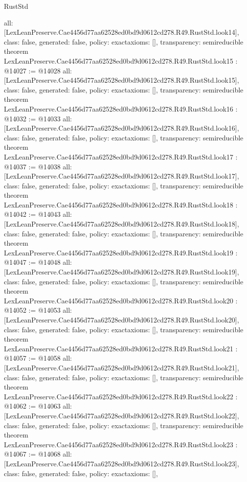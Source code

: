\begin{lexlean}{RustStd}
\begin{coremodule}
{  all: [LexLeanPreserve.Cae4456d77aa62528ed0bd9d0612cd278.R49.RustStd.look14],
  class: false,
  generated: false,
  policy: exact{axioms: []},
  transparency: semireducible
}
theorem LexLeanPreserve.Cae4456d77aa62528ed0bd9d0612cd278.R49.RustStd.look15 : @14027 := @14028 {
  all: [LexLeanPreserve.Cae4456d77aa62528ed0bd9d0612cd278.R49.RustStd.look15],
  class: false,
  generated: false,
  policy: exact{axioms: []},
  transparency: semireducible
}
theorem LexLeanPreserve.Cae4456d77aa62528ed0bd9d0612cd278.R49.RustStd.look16 : @14032 := @14033 {
  all: [LexLeanPreserve.Cae4456d77aa62528ed0bd9d0612cd278.R49.RustStd.look16],
  class: false,
  generated: false,
  policy: exact{axioms: []},
  transparency: semireducible
}
theorem LexLeanPreserve.Cae4456d77aa62528ed0bd9d0612cd278.R49.RustStd.look17 : @14037 := @14038 {
  all: [LexLeanPreserve.Cae4456d77aa62528ed0bd9d0612cd278.R49.RustStd.look17],
  class: false,
  generated: false,
  policy: exact{axioms: []},
  transparency: semireducible
}
theorem LexLeanPreserve.Cae4456d77aa62528ed0bd9d0612cd278.R49.RustStd.look18 : @14042 := @14043 {
  all: [LexLeanPreserve.Cae4456d77aa62528ed0bd9d0612cd278.R49.RustStd.look18],
  class: false,
  generated: false,
  policy: exact{axioms: []},
  transparency: semireducible
}
theorem LexLeanPreserve.Cae4456d77aa62528ed0bd9d0612cd278.R49.RustStd.look19 : @14047 := @14048 {
  all: [LexLeanPreserve.Cae4456d77aa62528ed0bd9d0612cd278.R49.RustStd.look19],
  class: false,
  generated: false,
  policy: exact{axioms: []},
  transparency: semireducible
}
theorem LexLeanPreserve.Cae4456d77aa62528ed0bd9d0612cd278.R49.RustStd.look20 : @14052 := @14053 {
  all: [LexLeanPreserve.Cae4456d77aa62528ed0bd9d0612cd278.R49.RustStd.look20],
  class: false,
  generated: false,
  policy: exact{axioms: []},
  transparency: semireducible
}
theorem LexLeanPreserve.Cae4456d77aa62528ed0bd9d0612cd278.R49.RustStd.look21 : @14057 := @14058 {
  all: [LexLeanPreserve.Cae4456d77aa62528ed0bd9d0612cd278.R49.RustStd.look21],
  class: false,
  generated: false,
  policy: exact{axioms: []},
  transparency: semireducible
}
theorem LexLeanPreserve.Cae4456d77aa62528ed0bd9d0612cd278.R49.RustStd.look22 : @14062 := @14063 {
  all: [LexLeanPreserve.Cae4456d77aa62528ed0bd9d0612cd278.R49.RustStd.look22],
  class: false,
  generated: false,
  policy: exact{axioms: []},
  transparency: semireducible
}
theorem LexLeanPreserve.Cae4456d77aa62528ed0bd9d0612cd278.R49.RustStd.look23 : @14067 := @14068 {
  all: [LexLeanPreserve.Cae4456d77aa62528ed0bd9d0612cd278.R49.RustStd.look23],
  class: false,
  generated: false,
  policy: exact{axioms: []},
}
\end{coremodule}
\end{lexlean}
